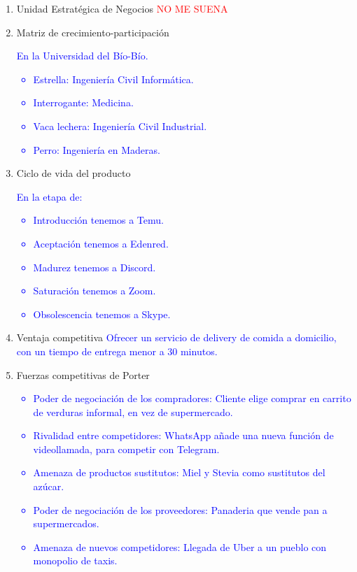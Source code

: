 \documentclass{templateNote}
\begin{document}
\begin{enumerate}
    \item Unidad Estratégica de Negocios\newline
    \textcolor{red}{
        NO ME SUENA
    }
    
    \item Matriz de crecimiento-participación\newline
    \textcolor{blue}{
        En la Universidad del Bío-Bío.
        \begin{itemize}
            \item Estrella: Ingeniería Civil Informática.
            \item Interrogante: Medicina.
            \item Vaca lechera: Ingeniería Civil Industrial.
            \item Perro: Ingeniería en Maderas.
        \end{itemize}
    }
    
    \item Ciclo de vida del producto\newline
    \textcolor{blue}{
        En la etapa de:
        \begin{itemize}
            \item Introducción tenemos a Temu.
            \item Aceptación tenemos a Edenred.
            \item Madurez tenemos a Discord.
            \item Saturación tenemos a Zoom.
            \item Obsolescencia tenemos a Skype.
        \end{itemize}
    }
    
    \item Ventaja competitiva\newline
    \textcolor{blue}{
        Ofrecer un servicio de delivery de comida a domicilio, con un tiempo de entrega menor a 30 minutos.
    }
    
    \item Fuerzas competitivas de Porter
    \textcolor{blue}{
        \begin{itemize}
            \item Poder de negociación de los compradores: Cliente elige comprar en carrito de verduras informal, en vez de supermercado.
            \item Rivalidad entre competidores: WhatsApp añade una nueva función de videollamada, para competir con Telegram.
            \item Amenaza de productos sustitutos: Miel y Stevia como sustitutos del azúcar.
            \item Poder de negociación de los proveedores: Panaderia que vende pan a supermercados.
            \item Amenaza de nuevos competidores: Llegada de Uber a un pueblo con monopolio de taxis.
        \end{itemize}
    }
\end{enumerate}
\end{document}
